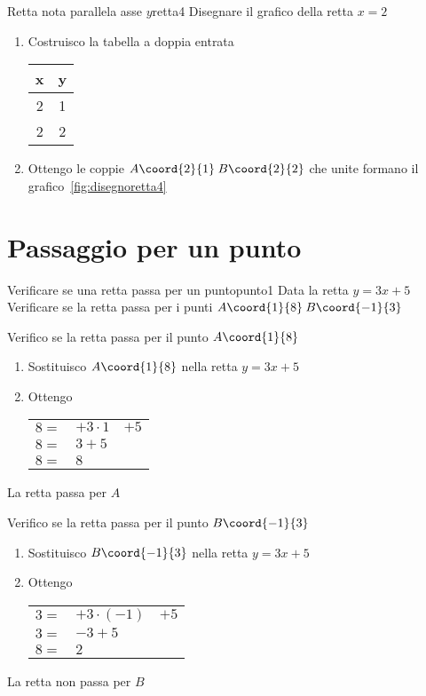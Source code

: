 \begin{esempiot}{Retta nota parallela asse $y$}{retta4}
	Disegnare il grafico della retta $x=2$
\end{esempiot}
\begin{enumerate}
	\item Costruisco la tabella a doppia entrata 
	\begin{tabular}{c|c}
		x & y\\
		\hline 
		2&1\\ 
		2&2\\ 
	\end{tabular}
	\item Ottengo le coppie $A\coord{2}{1}$\,$B\coord{2}{2}$ che unite formano il grafico~\vref{fig:disegnoretta4}
\end{enumerate}
\begin{center}
	
	\label{fig:disegnoretta4}
\end{center}
\section{Passaggio per un punto}
\begin{esempiot}{Verificare se una retta passa per un punto}{punto1}
Data la retta $y=3x+5$ Verificare se la retta passa per i punti $A\coord{1}{8}$\,$B\coord{-1}{3}$
\end{esempiot}
Verifico se la retta passa per il punto $A\coord{1}{8}$ 
\begin{enumerate}
	\item Sostituisco $A\coord{1}{8}$ nella retta $y=3x+5$ 
	\item Ottengo  \begin{tabular}{rll}
		$8=$&$+3\cdot 1$ &$+5$  \\ 
		$8=$&$3+5$  \\ 
		$8=$&$8$  \\ 
	\end{tabular}
\end{enumerate}	
	La retta passa per $A$
	
Verifico se la retta passa per il punto $B\coord{-1}{3}$
\begin{enumerate}
	\item Sostituisco $B\coord{-1}{3}$ nella retta $y=3x+5$ 
	\item Ottengo  \begin{tabular}{rll}
		$3=$&$+3\cdot (-1)$ &$+5$  \\ 
		$3=$&$-3+5$  \\ 
		$8=$&$2$  \\ 
	\end{tabular}
\end{enumerate}	
La retta non passa per $B$ 

